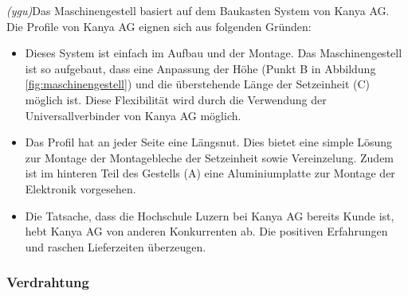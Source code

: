 \textit{(ygu)}Das Maschinengestell basiert auf dem Baukasten System von Kanya AG. Die Profile von Kanya AG eignen sich aus folgenden Gründen:
\begin{itemize}
	\item Dieses System ist einfach im Aufbau und der Montage. Das Maschinengestell ist so aufgebaut, dass eine Anpassung der Höhe (Punkt B in Abbildung \ref{fig:maschinengestell}) und die überstehende Länge der Setzeinheit (C) möglich ist. Diese Flexibilität wird durch die Verwendung der Universallverbinder von Kanya AG möglich.
	
	\item Das Profil hat an jeder Seite eine Längsnut. Dies bietet eine simple Lösung zur Montage der Montagebleche der Setzeinheit sowie Vereinzelung. Zudem ist im hinteren Teil des Gestells (A) eine Aluminiumplatte zur Montage der Elektronik vorgesehen.
	
	\item Die Tatsache, dass die Hochschule Luzern bei Kanya AG bereits Kunde ist, hebt Kanya AG von anderen Konkurrenten ab. Die positiven Erfahrungen und raschen Lieferzeiten überzeugen.
\end{itemize}


\subsubsection{Verdrahtung}